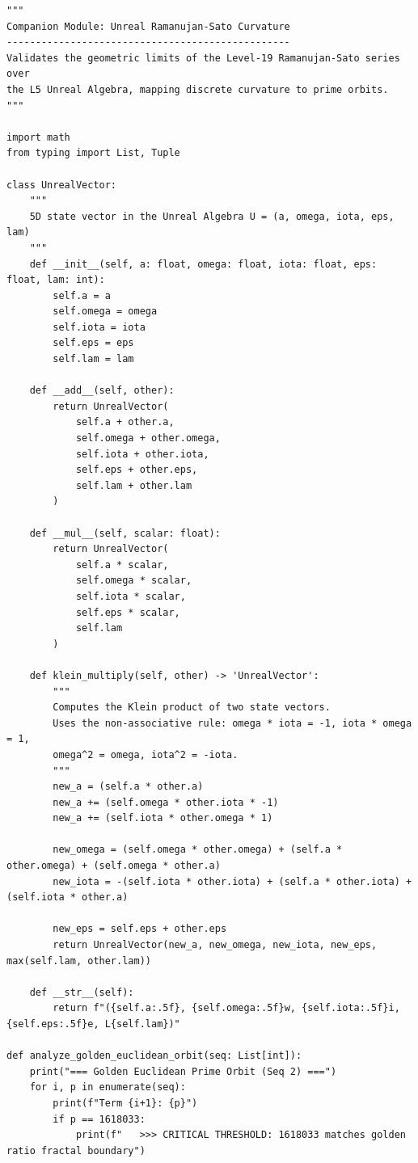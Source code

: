 \begin{verbatim}
"""
Companion Module: Unreal Ramanujan-Sato Curvature
-------------------------------------------------
Validates the geometric limits of the Level-19 Ramanujan-Sato series over
the L5 Unreal Algebra, mapping discrete curvature to prime orbits.
"""

import math
from typing import List, Tuple

class UnrealVector:
    """
    5D state vector in the Unreal Algebra U = (a, omega, iota, eps, lam)
    """
    def __init__(self, a: float, omega: float, iota: float, eps: float, lam: int):
        self.a = a
        self.omega = omega
        self.iota = iota
        self.eps = eps
        self.lam = lam

    def __add__(self, other):
        return UnrealVector(
            self.a + other.a,
            self.omega + other.omega,
            self.iota + other.iota,
            self.eps + other.eps,
            self.lam + other.lam
        )

    def __mul__(self, scalar: float):
        return UnrealVector(
            self.a * scalar,
            self.omega * scalar,
            self.iota * scalar,
            self.eps * scalar,
            self.lam
        )
        
    def klein_multiply(self, other) -> 'UnrealVector':
        """
        Computes the Klein product of two state vectors.
        Uses the non-associative rule: omega * iota = -1, iota * omega = 1,
        omega^2 = omega, iota^2 = -iota.
        """
        new_a = (self.a * other.a)
        new_a += (self.omega * other.iota * -1)
        new_a += (self.iota * other.omega * 1)
        
        new_omega = (self.omega * other.omega) + (self.a * other.omega) + (self.omega * other.a)
        new_iota = -(self.iota * other.iota) + (self.a * other.iota) + (self.iota * other.a)
        
        new_eps = self.eps + other.eps
        return UnrealVector(new_a, new_omega, new_iota, new_eps, max(self.lam, other.lam))
        
    def __str__(self):
        return f"({self.a:.5f}, {self.omega:.5f}w, {self.iota:.5f}i, {self.eps:.5f}e, L{self.lam})"

def analyze_golden_euclidean_orbit(seq: List[int]):
    print("=== Golden Euclidean Prime Orbit (Seq 2) ===")
    for i, p in enumerate(seq):
        print(f"Term {i+1}: {p}")
        if p == 1618033:
            print(f"   >>> CRITICAL THRESHOLD: 1618033 matches golden ratio fractal boundary")


\end{verbatim}
